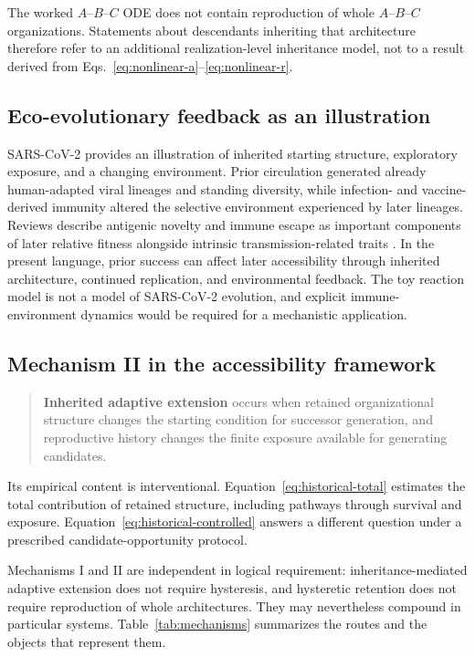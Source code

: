 \documentclass[11pt,a4paper]{article}
\begin{document}
The worked $A$--$B$--$C$ ODE does not contain reproduction of whole $A$--$B$--$C$ organizations. Statements about descendants inheriting that architecture therefore refer to an additional realization-level inheritance model, not to a result derived from Eqs.~\eqref{eq:nonlinear-a}--\eqref{eq:nonlinear-r}.

\subsection{Eco-evolutionary feedback as an illustration}

SARS-CoV-2 provides an illustration of inherited starting structure, exploratory exposure, and a changing environment. Prior circulation generated already human-adapted viral lineages and standing diversity, while infection- and vaccine-derived immunity altered the selective environment experienced by later lineages. Reviews describe antigenic novelty and immune escape as important components of later relative fitness alongside intrinsic transmission-related traits \citep{Carabelli2023}. In the present language, prior success can affect later accessibility through inherited architecture, continued replication, and environmental feedback. The toy reaction model is not a model of SARS-CoV-2 evolution, and explicit immune-environment dynamics would be required for a mechanistic application.

\subsection{Mechanism II in the accessibility framework}

\begin{quote}
\textbf{Inherited adaptive extension} occurs when retained organizational structure changes the starting condition for successor generation, and reproductive history changes the finite exposure available for generating candidates.
\end{quote}

Its empirical content is interventional. Equation~\eqref{eq:historical-total} estimates the total contribution of retained structure, including pathways through survival and exposure. Equation~\eqref{eq:historical-controlled} answers a different question under a prescribed candidate-opportunity protocol.

Mechanisms I and II are independent in logical requirement: inheritance-mediated adaptive extension does not require hysteresis, and hysteretic retention does not require reproduction of whole architectures. They may nevertheless compound in particular systems. Table~\ref{tab:mechanisms} summarizes the routes and the objects that represent them.
\end{document}
